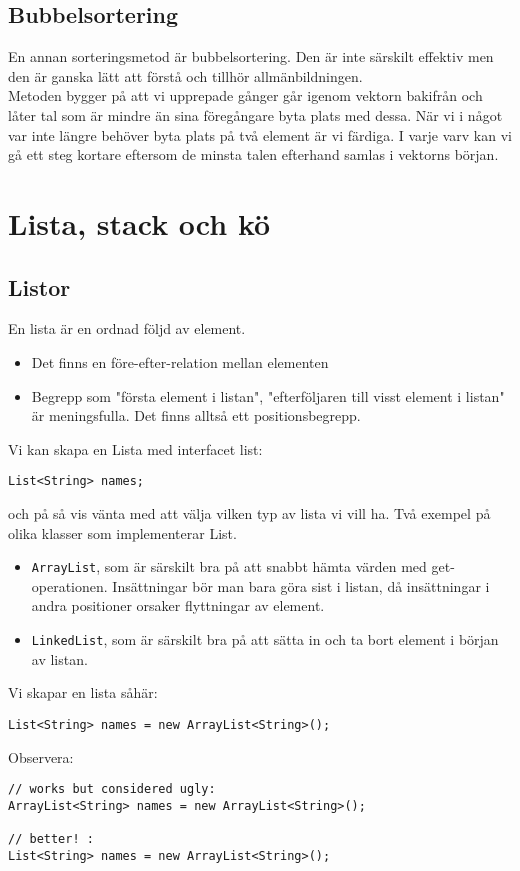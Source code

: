 \documentclass[11pt]{article}
\begin{document}
\subsection{Bubbelsortering}
En annan sorteringsmetod är bubbelsortering. Den är inte särskilt effektiv men den är ganska lätt att förstå och tillhör allmänbildningen. \\
Metoden bygger på att vi upprepade gånger går igenom vektorn bakifrån och låter tal som är mindre än sina föregångare byta plats med dessa. När vi i något var inte längre behöver byta plats på två element är vi färdiga. I varje varv kan vi gå ett steg kortare eftersom de minsta talen efterhand samlas i vektorns början. 
\section{Lista, stack och kö}
\subsection{Listor}
En lista är en ordnad följd av element.
\begin{itemize}
\item{Det finns en före-efter-relation mellan elementen}
\item{Begrepp som "första element i listan", "efterföljaren till visst element i listan" är meningsfulla. Det finns alltså ett positionsbegrepp.}
\end{itemize}
Vi kan skapa en Lista med interfacet list:
\begin{lstlisting}
List<String> names;
\end{lstlisting}
och på så vis vänta med att välja vilken typ av lista vi vill ha.
Två exempel på olika klasser som implementerar List.
\begin{itemize}
\item{ \verb+ArrayList+, som är särskilt bra på att snabbt hämta värden med get-operationen. Insättningar bör man bara göra sist i listan, då insättningar i andra positioner orsaker flyttningar av element.}
\item{ \verb+LinkedList+, som är särskilt bra på att sätta in och ta bort element i början av listan.}
\end{itemize}
Vi skapar en lista såhär:
\begin{lstlisting}
List<String> names = new ArrayList<String>();
\end{lstlisting}
Observera:
\begin{lstlisting}
// works but considered ugly:
ArrayList<String> names = new ArrayList<String>();

// better! :
List<String> names = new ArrayList<String>();
\end{lstlisting}
\end{document}
